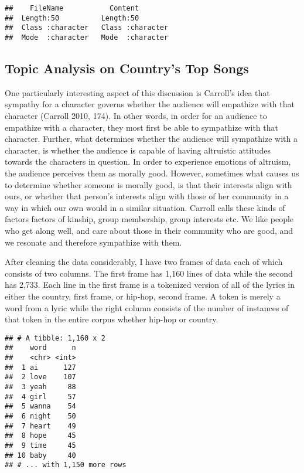 \documentclass[]{article}
\begin{document}
\begin{verbatim}
##    FileName           Content         
##  Length:50          Length:50         
##  Class :character   Class :character  
##  Mode  :character   Mode  :character
\end{verbatim}

\hypertarget{topic-analysis-on-countrys-top-songs}{%
\subsection{Topic Analysis on Country's Top
Songs}\label{topic-analysis-on-countrys-top-songs}}

One particularly interesting aspect of this discussion is Carroll's idea
that sympathy for a character governs whether the audience will
empathize with that character (Carroll 2010, 174). In other words, in
order for an audience to empathize with a character, they most first be
able to sympathize with that character. Further, what determines whether
the audience will sympathize with a character, is whether the audience
is capable of having altruistic attitudes towards the characters in
question. In order to experience emotions of altruism, the audience
perceives them as morally good. However, sometimes what causes us to
determine whether someone is morally good, is that their interests align
with ours, or whether that person's interests align with those of her
community in a way in which our own would in a similar situation.
Carroll calls these kinds of factors factors of kinship, group
membership, group interests etc. We like people who get along well, and
care about those in their community who are good, and we resonate and
therefore sympathize with them.

After cleaning the data considerably, I have two frames of data each of
which consists of two columns. The first frame has 1,160 lines of data
while the second has 2,733. Each line in the first frame is a tokenized
version of all of the lyrics in either the country, first frame, or
hip-hop, second frame. A token is merely a word from a lyric while the
right column consists of the number of instances of that token in the
entire corpus whether hip-hop or country.

\begin{verbatim}
## # A tibble: 1,160 x 2
##    word      n
##    <chr> <int>
##  1 ai      127
##  2 love    107
##  3 yeah     88
##  4 girl     57
##  5 wanna    54
##  6 night    50
##  7 heart    49
##  8 hope     45
##  9 time     45
## 10 baby     40
## # ... with 1,150 more rows
\end{verbatim}
\end{document}
